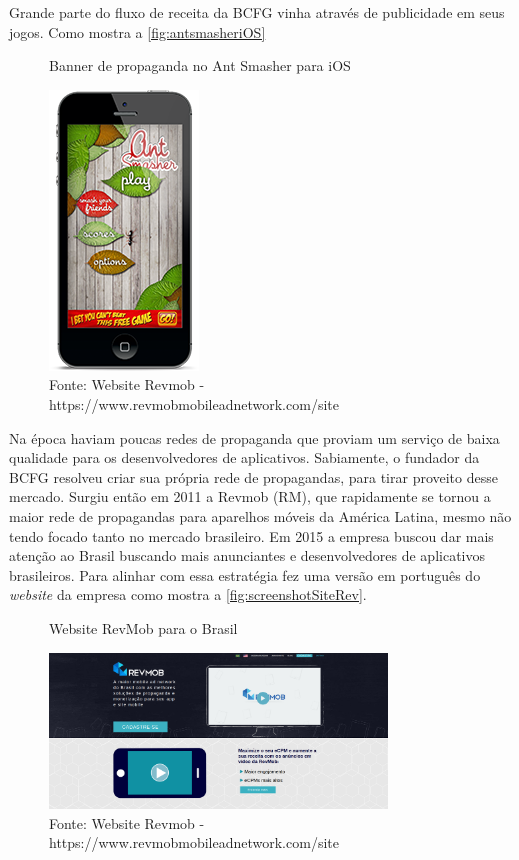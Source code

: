 Grande parte do fluxo de receita da BCFG vinha através de publicidade em seus jogos. Como mostra a \autoref{fig:antsmasheriOS}
\begin{figure}[H]
\caption{Banner de propaganda no Ant Smasher para iOS}
\centerline{\includegraphics[scale=0.5]{img/antsmasheriOS}}
\label{fig:antsmasheriOS}
\caption* {Fonte: Website Revmob - https://www.revmobmobileadnetwork.com/site}
\end{figure}

Na época haviam poucas redes de propaganda que proviam um serviço de baixa qualidade para os desenvolvedores de aplicativos. Sabiamente, o fundador da BCFG resolveu criar sua própria rede de propagandas, para tirar proveito desse mercado. Surgiu então em 2011 a Revmob (RM), que rapidamente se tornou a maior rede de propagandas para aparelhos móveis da América Latina, mesmo não tendo focado tanto no mercado brasileiro. Em 2015 a empresa buscou dar mais atenção ao Brasil buscando mais anunciantes e desenvolvedores de aplicativos brasileiros. Para alinhar com essa estratégia fez uma versão em português do \textit{website} da empresa como mostra a \autoref{fig:screenshotSiteRev}.

\begin{figure}[H]
\caption{Website RevMob para o Brasil}
\centerline{\includegraphics[width=0.8\textwidth]{img/screenshotSiteRev}}
\label{fig:screenshotSiteRev}
\caption* {Fonte: Website Revmob - https://www.revmobmobileadnetwork.com/site}
\end{figure}

